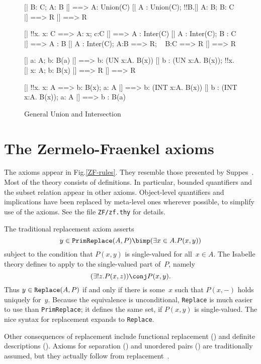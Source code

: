 \begin{figure}
\begin{ttbox}
    [| B: C;  A: B |] ==> A: Union(C)
    [| A : Union(C);  !!B.[| A: B;  B: C |] ==> R |] ==> R

    [| !!x. x: C ==> A: x;  c:C |] ==> A : Inter(C)
    [| A : Inter(C);  B : C |] ==> A : B
    [| A : Inter(C);  A:B ==> R;  ~ B:C ==> R |] ==> R

      [| a: A;  b: B(a) |] ==> b: (UN x:A. B(x))
      [| b : (UN x:A. B(x));  !!x.[| x: A;  b: B(x) |] ==> R 
          |] ==> R

     [| !!x. x: A ==> b: B(x);  a: A |] ==> b: (INT x:A. B(x))
     [| b : (INT x:A. B(x));  a: A |] ==> b : B(a)
\end{ttbox}
\caption{General Union and Intersection} \label{ZF-lemmas3}
\end{figure}


\section{The Zermelo-Fraenkel axioms}
The axioms appear in Fig.\ts \ref{ZF-rules}.  They resemble those
presented by Suppes~\cite{suppes72}.  Most of the theory consists of
definitions.  In particular, bounded quantifiers and the subset relation
appear in other axioms.  Object-level quantifiers and implications have
been replaced by meta-level ones wherever possible, to simplify use of the
axioms.  See the file {\tt ZF/zf.thy} for details.

The traditional replacement axiom asserts
\[ y \in {\tt PrimReplace}(A,P) \bimp (\exists x\in A. P(x,y)) \]
subject to the condition that $P(x,y)$ is single-valued for all~$x\in A$.
The Isabelle theory defines  to apply
 to the single-valued part of~$P$, namely
\[ (\exists!z.P(x,z)) \conj P(x,y). \]
Thus $y\in {\tt Replace}(A,P)$ if and only if there is some~$x$ such that
$P(x,-)$ holds uniquely for~$y$.  Because the equivalence is unconditional,
{\tt Replace} is much easier to use than {\tt PrimReplace}; it defines the
same set, if $P(x,y)$ is single-valued.  The nice syntax for replacement
expands to {\tt Replace}.

Other consequences of replacement include functional replacement
() and definite descriptions ().
Axioms for separation () and unordered pairs
() are traditionally assumed, but they actually follow
from replacement~\cite[pages 237--8]{suppes72}.

